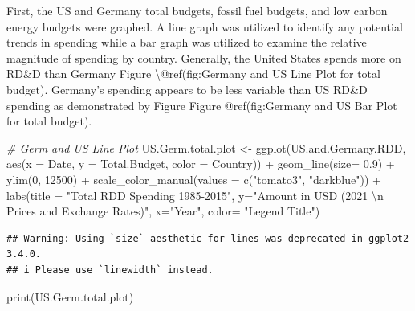 \documentclass[
  12pt,
]{article}
\newenvironment{Shaded}{\begin{snugshade}}{\end{snugshade}}
\newcommand{\AttributeTok}[1]{\textcolor[rgb]{0.77,0.63,0.00}{#1}}
\newcommand{\CommentTok}[1]{\textcolor[rgb]{0.56,0.35,0.01}{\textit{#1}}}
\newcommand{\DecValTok}[1]{\textcolor[rgb]{0.00,0.00,0.81}{#1}}
\newcommand{\FloatTok}[1]{\textcolor[rgb]{0.00,0.00,0.81}{#1}}
\newcommand{\FunctionTok}[1]{\textcolor[rgb]{0.00,0.00,0.00}{#1}}
\newcommand{\NormalTok}[1]{#1}
\newcommand{\OtherTok}[1]{\textcolor[rgb]{0.56,0.35,0.01}{#1}}
\newcommand{\SpecialCharTok}[1]{\textcolor[rgb]{0.00,0.00,0.00}{#1}}
\newcommand{\StringTok}[1]{\textcolor[rgb]{0.31,0.60,0.02}{#1}}
\begin{document}
First, the US and Germany total budgets, fossil fuel budgets, and low
carbon energy budgets were graphed. A line graph was utilized to
identify any potential trends in spending while a bar graph was utilized
to examine the relative magnitude of spending by country. Generally, the
United States spends more on RD\&D than Germany Figure
\textbackslash{}@ref(fig:Germany and US Line Plot for total budget).
Germany's spending appears to be less variable than US RD\&D spending as
demonstrated by Figure Figure @ref(fig:Germany and US Bar Plot for total
budget).

\begin{Shaded}
\begin{Highlighting}[]
\CommentTok{\# Germ and US Line Plot}
\NormalTok{US.Germ.total.plot }\OtherTok{\textless{}{-}} \FunctionTok{ggplot}\NormalTok{(US.and.Germany.RDD,}
                              \FunctionTok{aes}\NormalTok{(}\AttributeTok{x =}\NormalTok{ Date,}
                                  \AttributeTok{y =}\NormalTok{ Total.Budget, }
                                  \AttributeTok{color =}\NormalTok{ Country)) }\SpecialCharTok{+} 
  \FunctionTok{geom\_line}\NormalTok{(}\AttributeTok{size=} \FloatTok{0.9}\NormalTok{) }\SpecialCharTok{+}
  \FunctionTok{ylim}\NormalTok{(}\DecValTok{0}\NormalTok{, }\DecValTok{12500}\NormalTok{) }\SpecialCharTok{+}
  \FunctionTok{scale\_color\_manual}\NormalTok{(}\AttributeTok{values =} \FunctionTok{c}\NormalTok{(}\StringTok{"tomato3"}\NormalTok{, }\StringTok{"darkblue"}\NormalTok{)) }\SpecialCharTok{+}
  \FunctionTok{labs}\NormalTok{(}\AttributeTok{title =} \StringTok{"Total RDD Spending 1985{-}2015"}\NormalTok{,}
       \AttributeTok{y=}\StringTok{"Amount in USD (2021 }\SpecialCharTok{\textbackslash{}n}\StringTok{ Prices and Exchange Rates)"}\NormalTok{,}
       \AttributeTok{x=}\StringTok{"Year"}\NormalTok{,}
       \AttributeTok{color=} \StringTok{"Legend Title"}\NormalTok{)}
\end{Highlighting}
\end{Shaded}

\begin{verbatim}
## Warning: Using `size` aesthetic for lines was deprecated in ggplot2 3.4.0.
## i Please use `linewidth` instead.
\end{verbatim}

\begin{Shaded}
\begin{Highlighting}[]
\FunctionTok{print}\NormalTok{(US.Germ.total.plot)}
\end{Highlighting}
\end{Shaded}
\end{document}
